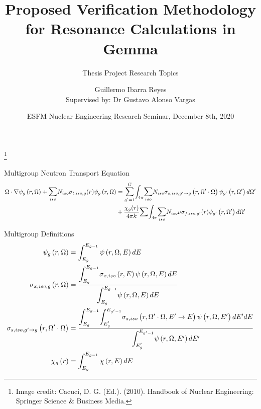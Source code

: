 \documentclass[sans,mathserif,aspectratio=169, 10pt]{beamer}
\title{Proposed Verification Methodology for Resonance Calculations in Gemma}
\subtitle{Thesis Project Research Topics}
\author[Guillermo Ibarra]{Guillermo Ibarra Reyes\\{\small Supervised by: Dr Gustavo Alonso Vargas}}
\date{ESFM Nuclear Engineering Research Seminar, December 8th, 2020}
\newcommand\blfootnote[1]{%
  \begingroup
  \renewcommand\thefootnote{}\footnote{#1}%
  \addtocounter{footnote}{-1}%
  \endgroup
}
\begin{document}
\begin{frame}
\titlepage
\end{frame}

\begin{frame}
\centering
{}
\blfootnote{Image credit: Cacuci, D. G. (Ed.). (2010). Handbook of Nuclear Engineering:  Springer Science \& Business Media. }
\end{frame}

\begin{frame}{Multigroup Neutron Transport Equation}
\begin{align}
\Omega \cdot \nabla \psi_g \left( r, \Omega \right) + \mathlarger{\sum}_{iso} N_{iso} \sigma_{t,iso,g} (r) \psi_g \left( r, \Omega \right) &= \mathlarger{\sum}_{g'=1}^G \mathlarger{\int}_{4\pi} \mathlarger{\sum}_{iso}  N_{iso} \sigma_{s,iso,g' \to g} \left( r, \Omega' \cdot \Omega \right) \psi_{g'} \left( r, \Omega' \right) d\Omega' \nonumber \\ 
&+ \frac{\chi_g (r)}{4\pi k} \mathlarger{\sum}  \mathlarger{\int}_{4\pi} \mathlarger{\sum}_{iso}  N_{iso} \nu \sigma_{f,iso,g'} (r) \psi_{g'} \left( r, \Omega' \right) d\Omega' 
\end{align}
\end{frame}

\begin{frame}{Multigroup Definitions}
\begin{subequations}
\begin{align}
\psi_g \left( r, \Omega \right) &= \int_{E_g}^{E_{g-1}} \psi \left( r, \Omega, E \right) dE \\
\sigma_{x,iso,g} \left( r, \Omega \right) &= \frac{ \mathlarger{\int}_{E_g}^{E_{g-1}} \sigma_{x,iso} \left( r, E \right) \psi \left( r, \Omega, E \right) dE}{ \mathlarger{\int}_{E_g}^{E_{g-1}} \psi \left( r, \Omega, E \right) dE} \\
\sigma_{s,iso,g' \to g} \left( r, \Omega' \cdot \Omega \right) &= \frac{\mathlarger{\int}_{E_g}^{E_{g-1}}\mathlarger{\int}_{E_g'}^{E_{g'-1}} \sigma_{s, iso} \left( r, \Omega' \cdot \Omega, E' \to E \right) \psi \left( r, \Omega, E' \right) dE' dE}{\mathlarger{\int}_{E_g'}^{E_{g'-1}} \psi \left( r, \Omega, E' \right) dE'} \\
\chi_g \left( r \right) &= \int_{E_g}^{E_{g-1}} \chi \left( r, E \right) dE
\end{align}
\end{subequations}
\end{frame}
\end{document}
